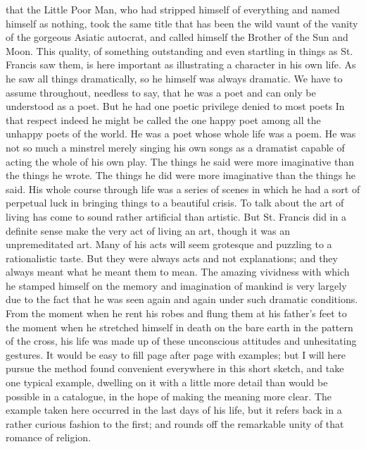\documentclass{book}
\begin{document}
that the Little Poor Man, who had stripped himself of everything and named himself as nothing, took the same title that has been the wild vaunt of the vanity of the gorgeous Asiatic autocrat, and called himself the Brother of the Sun and Moon. This quality, of something outstanding and even startling in things as St. Francis saw them, is here important as illustrating a character in his own life. As he saw all things dramatically, so he himself was always dramatic. We have to assume throughout, needless to say, that he was a poet and can only be understood as a poet. But he had one poetic privilege denied to most poets In that respect indeed he might be called the one happy poet among all the unhappy poets of the world. He was a poet whose whole life was a poem. He was not so much a minstrel merely singing his own songs as a dramatist capable of acting the whole of his own play. The things he said were more imaginative than the things he wrote. The things he did were more imaginative than the things he said. His whole course through life was a series of scenes in which he had a sort of perpetual luck in bringing things to a beautiful crisis. To talk about the art of living has come to sound rather artificial than artistic. But St. Francis did in a definite sense make the very act of living an art, though it was an unpremeditated art. Many of his acts will seem grotesque and puzzling to a rationalistic taste. But they were always acts and not explanations; and they always meant what he meant them to mean. The amazing vividness with which he stamped himself on the memory and imagination of mankind is very largely due to the fact that he was seen again and again under such dramatic conditions. From the moment when he rent his robes and flung them at his father’s feet to the moment when he stretched himself in death on the bare earth in the pattern of the cross, his life was made up of these unconscious attitudes and unhesitating gestures. It would be easy to fill page after page with examples; but I will here pursue the method found convenient everywhere in this short sketch, and take one typical example, dwelling on it with a little more detail than would be possible in a catalogue, in the hope of making the meaning more clear. The example taken here occurred in the last days of his life, but it refers back in a rather curious fashion to the first; and rounds off the remarkable unity of that romance of religion.
\end{document}
